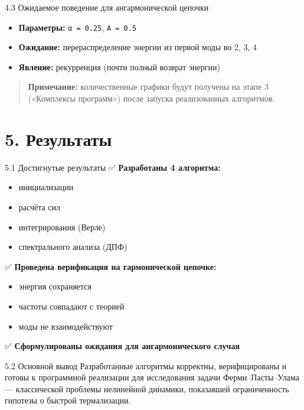 \documentclass[
  ignorenonframetext,
  aspectratio=169,
  russian,
]{beamer}
\providecommand{\tightlist}{%
  \setlength{\itemsep}{0pt}\setlength{\parskip}{0pt}}\usepackage{longtable,booktabs,array}
\begin{document}
\begin{frame}[fragile]{4.3 Ожидаемое поведение для ангармонической
цепочки}
\label{ux43eux436ux438ux434ux430ux435ux43cux43eux435-ux43fux43eux432ux435ux434ux435ux43dux438ux435-ux434ux43bux44f-ux430ux43dux433ux430ux440ux43cux43eux43dux438ux447ux435ux441ux43aux43eux439-ux446ux435ux43fux43eux447ux43aux438}
\begin{itemize}[<+->]
\tightlist
\item
  \textbf{Параметры:} \texttt{α\ =\ 0.25}, \texttt{A\ =\ 0.5}
\item
  \textbf{Ожидание:} перераспределение энергии из первой моды во 2, 3, 4
\item
  \textbf{Явление:} рекурренция (почти полный возврат энергии)
\end{itemize}

\begin{quote}
\textbf{Примечание:} количественные графики будут получены на этапе 3
(«Комплексы программ») после запуска реализованных алгоритмов.
\end{quote}
\end{frame}

\section{5. Результаты}\label{ux440ux435ux437ux443ux43bux44cux442ux430ux442ux44b}

\begin{frame}{5.1 Достигнутые результаты}
\label{ux434ux43eux441ux442ux438ux433ux43dux443ux442ux44bux435-ux440ux435ux437ux443ux43bux44cux442ux430ux442ux44b}
✅ \textbf{Разработаны 4 алгоритма:}

\begin{itemize}[<+->]
\tightlist
\item
  инициализации
\item
  расчёта сил
\item
  интегрирования (Верле)
\item
  спектрального анализа (ДПФ)
\end{itemize}

✅ \textbf{Проведена верификация на гармонической цепочке:}

\begin{itemize}[<+->]
\tightlist
\item
  энергия сохраняется
\item
  частоты совпадают с теорией
\item
  моды не взаимодействуют
\end{itemize}

✅ \textbf{Сформулированы ожидания для ангармонического случая}
\end{frame}

\begin{frame}{5.2 Основной вывод}
\label{ux43eux441ux43dux43eux432ux43dux43eux439-ux432ux44bux432ux43eux434}
Разработанные алгоритмы корректны, верифицированы и готовы к программной
реализации для исследования задачи Ферми--Пасты--Улама --- классической
проблемы нелинейной динамики, показавшей ограниченность гипотезы о
быстрой термализации.
\end{frame}
\end{document}
